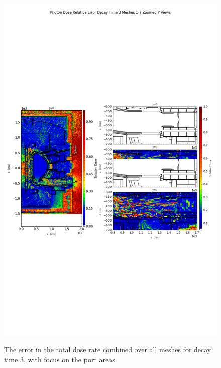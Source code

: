 \documentclass[12pt]{article}
\begin{document}
\begin{figure}[ht!]
\centering
\includegraphics[trim={0cm 9cm 0cm 10cm},clip,scale=0.75]{../plots/final_model/Photon_Dose_Relative_Error_Decay_Time_3_Meshes_1-7_Zoomed_Y_Views.png}
\label{fig:photons_dc3_no4bc_total_error_zoomed}
\caption{The error in the total dose rate combined over all meshes for decay time 3, with focus on the port areas}
\end{figure}
\clearpage
\end{document}
